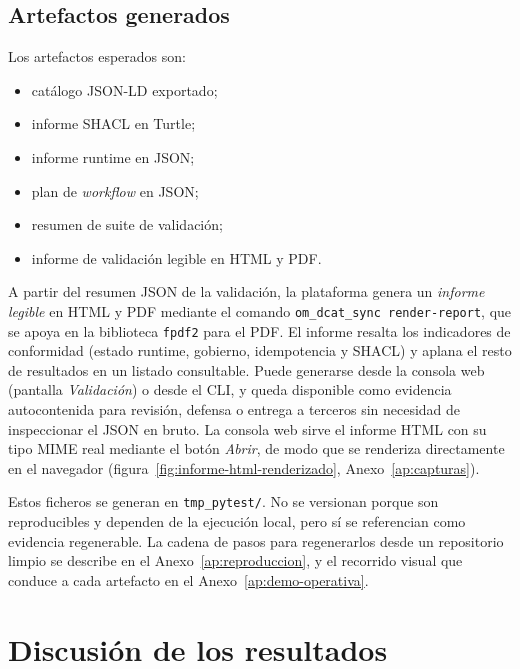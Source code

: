 \subsection{Artefactos generados}

Los artefactos esperados son:

\begin{itemize}
  \item catálogo JSON-LD exportado;
  \item informe SHACL en Turtle;
  \item informe runtime en JSON;
  \item plan de \emph{workflow} en JSON;
  \item resumen de suite de validación;
  \item informe de validación legible en HTML y PDF.
\end{itemize}

A partir del resumen JSON de la validación, la plataforma genera un \emph{informe legible} en HTML y PDF mediante el comando \texttt{om\_dcat\_sync render-report}, que se apoya en la biblioteca \texttt{fpdf2} para el PDF. El informe resalta los indicadores de conformidad (estado runtime, gobierno, idempotencia y \ac{SHACL}) y aplana el resto de resultados en un listado consultable. Puede generarse desde la consola web (pantalla \emph{Validación}) o desde el \ac{CLI}, y queda disponible como evidencia autocontenida para revisión, defensa o entrega a terceros sin necesidad de inspeccionar el \ac{JSON} en bruto. La consola web sirve el informe HTML con su tipo \ac{MIME} real mediante el botón \emph{Abrir}, de modo que se renderiza directamente en el navegador (figura~\ref{fig:informe-html-renderizado}, Anexo~\ref{ap:capturas}).

Estos ficheros se generan en \texttt{tmp\_pytest/}. No se versionan porque son reproducibles y dependen de la ejecución local, pero sí se referencian como evidencia regenerable. La cadena de pasos para regenerarlos desde un repositorio limpio se describe en el Anexo~\ref{ap:reproduccion}, y el recorrido visual que conduce a cada artefacto en el Anexo~\ref{ap:demo-operativa}.

\section{Discusión de los resultados}\label{sec:discusion-resultados}

